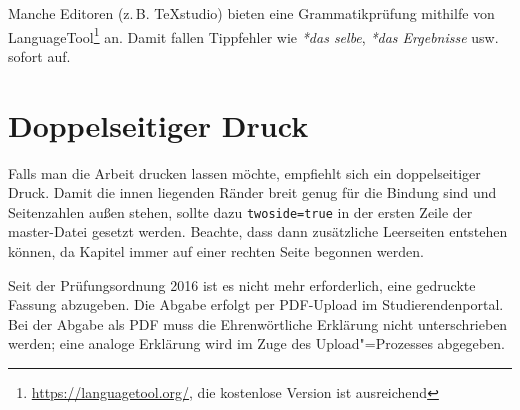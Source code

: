 Manche Editoren (z.\,B. TeXstudio) bieten eine Grammatikprüfung mithilfe von LanguageTool\footnote{\url{https://languagetool.org/}, die kostenlose Version ist ausreichend} an.
Damit fallen Tippfehler wie \emph{*das selbe}, \emph{*das Ergebnisse} usw. sofort auf.

\section{Doppelseitiger Druck}

Falls man die Arbeit drucken lassen möchte, empfiehlt sich ein doppelseitiger Druck.
Damit die innen liegenden Ränder breit genug für die Bindung sind und Seitenzahlen außen stehen, sollte dazu \verb|twoside=true| in der ersten Zeile der master-Datei gesetzt werden.
Beachte, dass dann zusätzliche Leerseiten entstehen können, da Kapitel immer auf einer rechten Seite begonnen werden.

Seit der Prüfungsordnung 2016 ist es nicht mehr erforderlich, eine gedruckte Fassung abzugeben.
Die Abgabe erfolgt per PDF-Upload im Studierendenportal.
Bei der Abgabe als PDF muss die Ehrenwörtliche Erklärung nicht unterschrieben werden; eine analoge Erklärung wird im Zuge des Upload"=Prozesses abgegeben.
